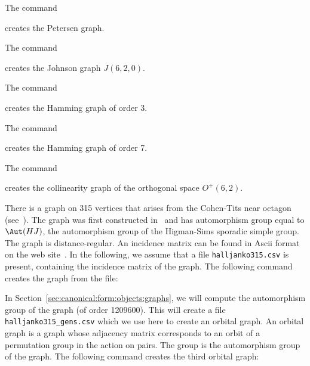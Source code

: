 \bigskip

The command 


creates the Petersen graph. 

\bigskip

The command 


creates the Johnson graph $J(6,2,0).$ 

\bigskip


The command 


creates the Hamming graph of order 3. 

\bigskip

The command 


creates the Hamming graph of order 7. 

\bigskip


The command 


creates the collinearity graph of the orthogonal space
$O^+(6,2).$






\bigskip

There is a graph on 315 vertices 
that arises from the Cohen-Tits near octagon (see~\cite{Brouwer315}). 
The graph was first constructed in~\cite{Cohen1981} 
and has automorphism group equal to $\Aut(HJ)$, 
the automorphism group of the Higman-Sims sporadic simple group.
The graph is distance-regular.
An incidence matrix can be found in 
Ascii format on the web site~\cite{Bayley}. 
In the following, we assume that a file \verb'halljanko315.csv' 
is present, containing the incidence matrix of the graph. 
The following command creates the graph from the file:


In Section~\ref{sec:canonical:form:objects:graphs}, 
we will compute the automorphism group of the graph (of order 1209600). 
This will create a file \verb'halljanko315_gens.csv' 
which we use here to create an orbital graph.
An orbital graph is a graph whose adjacency matrix corresponds 
to an orbit of a permutation group in the action on pairs. 
The group is the automorphism group of the graph.
The following command creates the third orbital graph:



